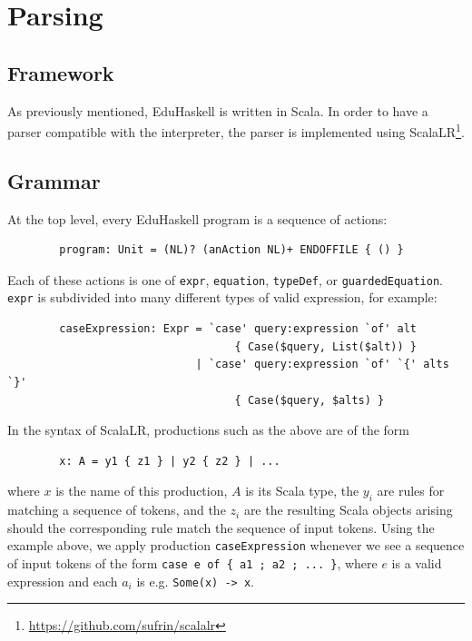 \documentclass[12pt, a4paper]{report}
\theoremstyle{definition}
\begin{document}
	\section{Parsing}
	\subsection{Framework}
	As previously mentioned, EduHaskell is written in Scala. In order to have a parser compatible with the interpreter, the parser is implemented using ScalaLR\footnote{\url{https://github.com/sufrin/scalalr}}.
	
	\subsection{Grammar}
	At the top level, every EduHaskell program is a sequence of actions:
	\begin{verbatim}
		program: Unit = (NL)? (anAction NL)+ ENDOFFILE { () }
	\end{verbatim}
	
	\vspace{-12pt}
	
	Each of these actions is one of \texttt{expr}, \texttt{equation}, \texttt{typeDef}, or \texttt{guardedEquation}. \texttt{expr} is subdivided into many different types of valid expression, for example:
	\begin{verbatim}
		caseExpression: Expr = `case' query:expression `of' alt
		                           { Case($query, List($alt)) }
		                     | `case' query:expression `of' `{' alts `}'
		                           { Case($query, $alts) }
	\end{verbatim}
	\vspace{-12pt}
	
	In the syntax of ScalaLR, productions such as the above are of the form
	\begin{verbatim}
		x: A = y1 { z1 } | y2 { z2 } | ...
	\end{verbatim}
	\vspace{-16pt}
	where $x$ is the name of this production, $A$ is its Scala type, the $y_i$ are rules for matching a sequence of tokens, and the $z_i$ are the resulting Scala objects arising should the corresponding rule match the sequence of input tokens. Using the example above, we apply production \texttt{caseExpression} whenever we see a sequence of input tokens of the form \texttt{case e of \{ a1 ; a2 ; ... \}}, where $e$ is a valid expression and each $a_i$ is e.g. \texttt{Some(x) -> x}.
	
\end{document}
